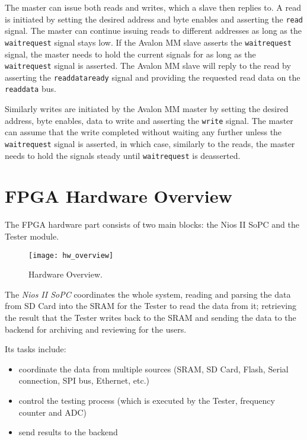 The master can issue both reads and writes, which a slave then replies to. A read
is initiated by setting the desired address and byte enables and asserting the \texttt{read}
signal. The master can continue issuing reads to different addresses as long as the \texttt{waitrequest}
signal stays low. If the Avalon MM slave asserts the \texttt{waitrequest} signal, the master needs
to hold the current signals for as long as the \texttt{waitrequest} signal is asserted.
The Avalon MM slave will reply to the read by asserting the \texttt{readdataready} signal
and providing the requested read data on the \texttt{readdata} bus.

Similarly writes are initiated by the Avalon MM master by setting the desired address, byte enables,
data to write and asserting the \texttt{write} signal. The master can assume that the write completed
without waiting any further unless the \texttt{waitrequest} signal is asserted, in which case,
similarly to the reads, the master needs to hold the signals steady until \texttt{waitrequest} is deasserted.



\newpage
\section{FPGA Hardware Overview}

The FPGA hardware part consists of two main blocks: the Nios II SoPC and the Tester module.

\begin{figure}
 \centering
 \texttt{[image: hw\_overview]}
 \caption{Hardware Overview.}
 \label{fig:hw_overview}
\end{figure}



The \textit{Nios II SoPC} coordinates the whole system, reading and parsing the data from SD Card
into the SRAM for the Tester to read the data from it; retrieving the result that the
Tester writes back to the SRAM and sending the data to the backend for archiving and reviewing for the users.

Its tasks include:
\begin{itemize}
 \item coordinate the data from multiple sources (SRAM, SD Card, Flash, Serial connection, SPI bus, Ethernet, etc.)
 \item control the testing process (which is executed by the Tester, frequency counter and ADC)
 \item send results to the backend
\end{itemize}


